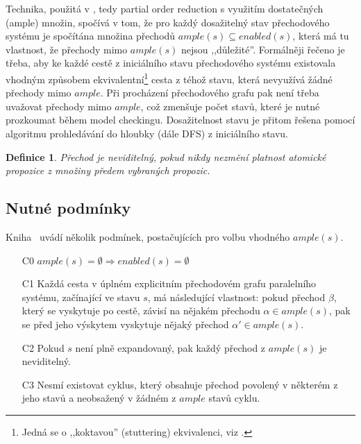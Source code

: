 \documentclass[12pt]{fithesis2}
\newtheorem{definition}{Definice}
\begin{document}
Technika, použitá v \cite{CLARKE}, tedy partial order reduction s využitím dostatečných (ample) množin, spočívá v tom, že pro každý dosažitelný stav přechodového systému je spočítána množina přechodů $\mathit{ample}(s) \subseteq \mathit{enabled}(s)$, která má tu vlastnost, že přechody mimo $\mathit{ample}(s)$ nejsou ,,důležité''. Formálněji řečeno je třeba, aby ke každé cestě z iniciálního stavu přechodového systému existovala vhodným způsobem ekvivalentní\footnote{Jedná se o ,,koktavou'' (stuttering) ekvivalenci, viz \cite{CLARKE}.} cesta z téhož stavu, která nevyužívá žádné přechody mimo $\mathit{ample}$. Při procházení přechodového grafu pak není třeba uvažovat přechody mimo $\mathit{ample}$, což zmenšuje počet stavů, které je nutné prozkoumat během model checkingu. Dosažitelnost stavu je přitom řešena pomocí algoritmu prohledávání do hloubky (dále DFS) z iniciálního stavu.

\begin{definition}
Přechod je neviditelný, pokud nikdy nezmění platnost atomické propozice z množiny předem vybraných propozic.
\end{definition}

\subsection{Nutné podmínky}
\label{subsec:por:ample-conditions}
Kniha~\cite{CLARKE} uvádí několik podmínek, postačujících pro volbu vhodného $\mathit{ample}(s)$.

\begin{enumerate}
\item[C0] $\mathit{ample}(s) = \emptyset \Rightarrow \mathit{enabled}(s) = \emptyset$
\item[C1] Každá cesta v úplném explicitním přechodovém grafu paralelního systému, začínající ve stavu $s$, má následující vlastnost: pokud přechod $\beta$, který se vyskytuje po cestě, závisí na nějakém přechodu $\alpha \in \mathit{ample}(s)$, pak se před jeho výskytem vyskytuje nějaký přechod $\alpha' \in \mathit{ample}(s)$.
\item[C2] Pokud $s$ není plně expandovaný, pak každý přechod z $\mathit{ample}(s)$ je neviditelný.
\item[C3] Nesmí existovat cyklus, který obsahuje přechod povolený v některém z jeho stavů a neobsažený v žádném z $\mathit{ample}$ stavů cyklu.
\end{enumerate}
\end{document}

